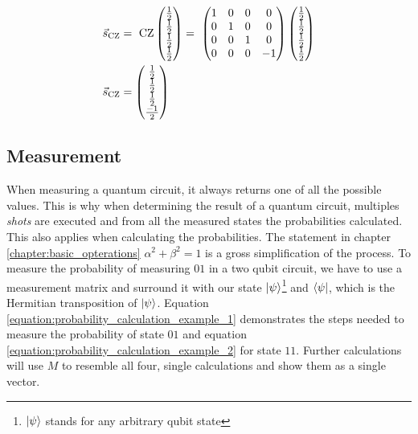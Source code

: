 \begin{equation}
    \centering
    \begin{split}
        \vec{s}_{\mathrm{CZ}} &=\ \mathrm{CZ}\begin{pmatrix}
            \frac{1}{2}\\\frac{1}{2}\\\frac{1}{2}\\\frac{1}{2}
        \end{pmatrix} =\  \begin{pmatrix}
        1 & 0 & 0 & 0 \\
        0 & 1 & 0 & 0 \\
        0 & 0 & 1 & 0 \\
        0 & 0 & 0 & -1
    \end{pmatrix}\begin{pmatrix}
            \frac{1}{2}\\\frac{1}{2}\\\frac{1}{2}\\\frac{1}{2}
        \end{pmatrix} \\
        \vec{s}_{\mathrm{CZ}} &= \begin{pmatrix}
            \frac{1}{2}\\\frac{1}{2}\\\frac{1}{2}\\\frac{-1}{2}
        \end{pmatrix}
    \end{split}
    \label{equation:cz_entanglement}
\end{equation}

\subsection{Measurement}
When measuring a quantum circuit, it always returns one of all the possible values. This is why when determining the result of a quantum circuit, multiples \emph{shots} are executed and from all the measured states the probabilities calculated. This also applies when calculating the probabilities. The statement in chapter \ref{chapter:basic_opterations} $\alpha^2 + \beta^2 = 1$ is a gross simplification of the process. To measure the probability of measuring $01$ in a two qubit circuit, we have to use a measurement matrix and surround it with our state $\ket{\psi}$\footnote{$\ket{\psi}$ stands for any arbitrary qubit state} and $\bra{\psi}$, which is the Hermitian transposition of $\ket{\psi}$. Equation \ref{equation:probability_calculation_example_1} demonstrates the steps needed to measure the probability of state $01$ and equation \ref{equation:probability_calculation_example_2} for state $11$. Further calculations will use $M$ to resemble all four, single calculations and show them as a single vector.

